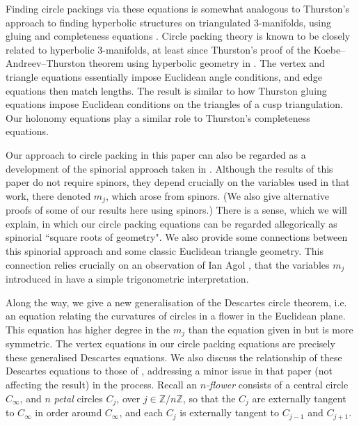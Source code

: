 \documentclass[12pt]{amsart}
\numberwithin{equation}{section}
\theoremstyle{named}
\newcommand{\Z}{\mathbb{Z}}
\begin{document}
 Finding circle packings via these equations is somewhat analogous to Thurston's approach to finding hyperbolic structures on triangulated 3-manifolds, using gluing and completeness equations \cite{Thurston_notes, Thurston97}. Circle packing theory is known to be closely related to hyperbolic 3-manifolds, at least since Thurston's proof of the Koebe--Andreev--Thurston theorem using hyperbolic geometry in \cite[ch. 13]{Thurston_notes}. The vertex and triangle equations essentially impose Euclidean angle conditions, and edge equations then match lengths. The result is similar to how Thurston gluing equations impose Euclidean conditions on the triangles of a cusp triangulation. Our holonomy equations play a similar role to Thurston's completeness equations.

Our approach to circle packing in this paper can also be regarded as a development of the spinorial approach taken in \cite{MZ25}. Although the results of this paper do not require spinors, they depend crucially on the variables used in that work, there denoted $m_j$, which arose from spinors. (We also give alternative proofs of some of our results here using spinors.) There is a sense, which we will explain, in which our circle packing equations can be regarded allegorically as spinorial ``square roots of geometry". We also provide some connections between this spinorial approach and some classic Euclidean triangle geometry. This connection relies crucially on an observation of Ian Agol \cite{Agol_email}, that the variables $m_j$ introduced in \cite{MZ25} have a simple trigonometric interpretation.

Along the way, we give a new generalisation of the Descartes circle theorem, i.e. an equation relating the curvatures of circles in a flower in the Euclidean plane. This equation has higher degree in the $m_j$ than the equation given in \cite{MZ25} but is more symmetric. The vertex equations in our circle packing equations are precisely these generalised Descartes equations. We also discuss the relationship of these Descartes equations to those of \cite{MZ25}, addressing a minor issue in that paper (not affecting the result) in the process. Recall an \emph{$n$-flower} consists of a central circle $C_\infty$, and $n$ \emph{petal} circles $C_j$, over $j \in \Z/n\Z$, so that the $C_j$ are externally tangent to $C_\infty$ in order around $C_\infty$, and each $C_j$ is externally tangent to $C_{j-1}$ and $C_{j+1}$.
\end{document}
